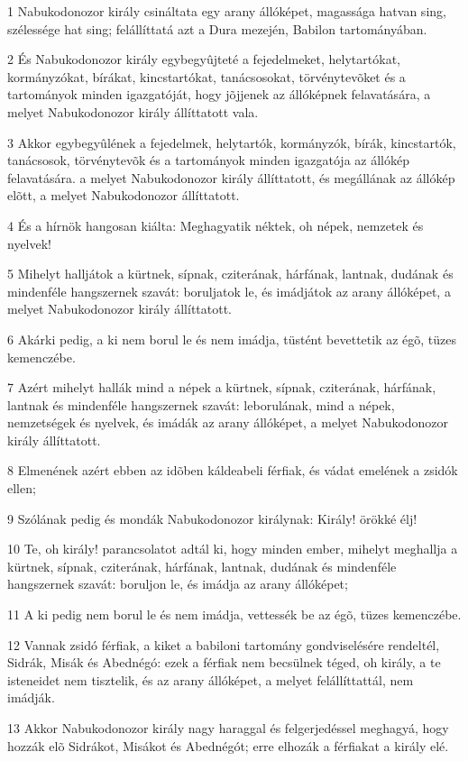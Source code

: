 \par 1 Nabukodonozor király csináltata egy arany állóképet, magassága hatvan sing, szélessége hat sing; felállíttatá azt a Dura mezején, Babilon tartományában.
\par 2 És Nabukodonozor király egybegyûjteté a fejedelmeket, helytartókat, kormányzókat, bírákat, kincstartókat, tanácsosokat, törvénytevõket és a tartományok minden igazgatóját, hogy jõjjenek az állóképnek felavatására, a melyet Nabukodonozor király állíttatott vala.
\par 3 Akkor egybegyûlének a fejedelmek, helytartók, kormányzók, bírák, kincstartók, tanácsosok, törvénytevõk és a tartományok minden igazgatója az állókép felavatására. a melyet Nabukodonozor király állíttatott, és megállának az állókép elõtt, a melyet Nabukodonozor állíttatott.
\par 4 És a hírnök hangosan kiálta: Meghagyatik néktek, oh népek, nemzetek és nyelvek!
\par 5 Mihelyt halljátok a kürtnek, sípnak, cziterának, hárfának, lantnak, dudának és mindenféle hangszernek szavát: boruljatok le, és imádjátok az arany állóképet, a melyet Nabukodonozor király állíttatott.
\par 6 Akárki pedig, a ki nem borul le és nem imádja, tüstént bevettetik az égõ, tüzes kemenczébe.
\par 7 Azért mihelyt hallák mind a népek a kürtnek, sípnak, cziterának, hárfának, lantnak és mindenféle hangszernek szavát: leborulának, mind a népek, nemzetségek és nyelvek, és imádák az arany állóképet, a melyet Nabukodonozor király állíttatott.
\par 8 Elmenének azért ebben az idõben káldeabeli férfiak, és vádat emelének a zsidók ellen;
\par 9 Szólának pedig és mondák Nabukodonozor királynak: Király! örökké élj!
\par 10 Te, oh király! parancsolatot adtál ki, hogy minden ember, mihelyt meghallja a kürtnek, sípnak, cziterának, hárfának, lantnak, dudának és mindenféle hangszernek szavát: boruljon le, és imádja az arany állóképet;
\par 11 A ki pedig nem borul le és nem imádja, vettessék be az égõ, tüzes kemenczébe.
\par 12 Vannak zsidó férfiak, a kiket a babiloni tartomány gondviselésére rendeltél, Sidrák, Misák és Abednégó: ezek a férfiak nem becsülnek téged, oh király, a te isteneidet nem tisztelik, és az arany állóképet, a melyet felállíttattál, nem imádják.
\par 13 Akkor Nabukodonozor király nagy haraggal és felgerjedéssel meghagyá, hogy hozzák elõ Sidrákot, Misákot és Abednégót; erre elhozák a férfiakat a király elé.
